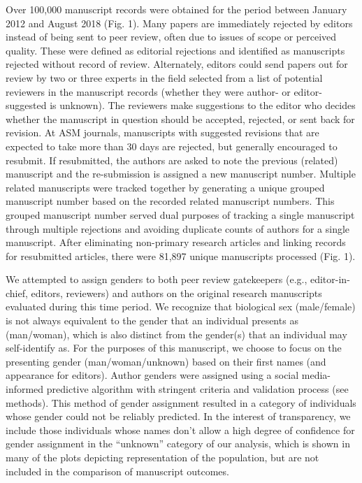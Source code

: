 \documentclass[11pt,]{article}
\begin{document}
Over 100,000 manuscript records were obtained for the period between
January 2012 and August 2018 (Fig. 1). Many papers are immediately
rejected by editors instead of being sent to peer review, often due to
issues of scope or perceived quality. These were defined as editorial
rejections and identified as manuscripts rejected without record of
review. Alternately, editors could send papers out for review by two or
three experts in the field selected from a list of potential reviewers
in the manuscript records (whether they were author- or editor-suggested
is unknown). The reviewers make suggestions to the editor who decides
whether the manuscript in question should be accepted, rejected, or sent
back for revision. At ASM journals, manuscripts with suggested revisions
that are expected to take more than 30 days are rejected, but generally
encouraged to resubmit. If resubmitted, the authors are asked to note
the previous (related) manuscript and the re-submission is assigned a
new manuscript number. Multiple related manuscripts were tracked
together by generating a unique grouped manuscript number based on the
recorded related manuscript numbers. This grouped manuscript number
served dual purposes of tracking a single manuscript through multiple
rejections and avoiding duplicate counts of authors for a single
manuscript. After eliminating non-primary research articles and linking
records for resubmitted articles, there were 81,897 unique manuscripts
processed (Fig. 1).

We attempted to assign genders to both peer review gatekeepers (e.g.,
editor-in-chief, editors, reviewers) and authors on the original
research manuscripts evaluated during this time period. We recognize
that biological sex (male/female) is not always equivalent to the gender
that an individual presents as (man/woman), which is also distinct from
the gender(s) that an individual may self-identify as. For the purposes
of this manuscript, we choose to focus on the presenting gender
(man/woman/unknown) based on their first names (and appearance for
editors). Author genders were assigned using a social media-informed
predictive algorithm with stringent criteria and validation process (see
methods). This method of gender assignment resulted in a category of
individuals whose gender could not be reliably predicted. In the
interest of transparency, we include those individuals whose names don't
allow a high degree of confidence for gender assignment in the
``unknown'' category of our analysis, which is shown in many of the
plots depicting representation of the population, but are not included
in the comparison of manuscript outcomes.
\end{document}
